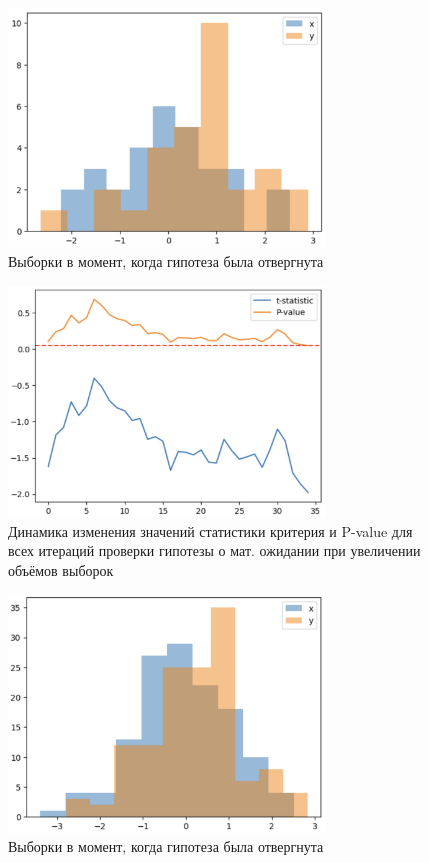 \begin{figure}
	\begin{center}
		\includegraphics[width=0.75\textwidth]{images/3.png}
	\end{center}
	\caption{Выборки в момент, когда гипотеза была отвергнута}
	\label{img:3}
\end{figure}

\begin{figure}
	\begin{center}
		\includegraphics[width=0.75\textwidth]{images/4.png}
	\end{center}
	\caption{Динамика изменения значений статистики критерия и P-value для всех итераций проверки гипотезы о мат. ожидании при увеличении объёмов выборок}
	\label{img:4}
\end{figure}

\begin{figure}
	\begin{center}
		\includegraphics[width=0.75\textwidth]{images/5.png}
	\end{center}
	\caption{Выборки в момент, когда гипотеза была отвергнута}
	\label{img:5}
\end{figure}

\clearpage
